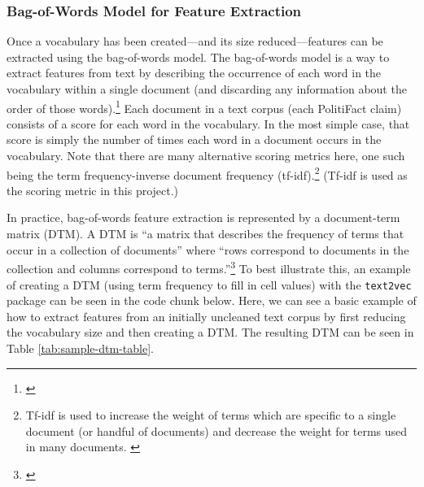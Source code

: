 \documentclass[12pt]{article}
\begin{document}
\hypertarget{bag-of-words-model-for-feature-extraction}{%
\subsubsection{Bag-of-Words Model for Feature
Extraction}\label{bag-of-words-model-for-feature-extraction}}

\label{sec:bag-of-words}

Once a vocabulary has been created---and its size reduced---features can
be extracted using the bag-of-words model. The bag-of-words model is a
way to extract features from text by describing the occurrence of each
word in the vocabulary within a single document (and discarding any
information about the order of those words).\footnote{\citet{brownleeGentleIntroductionBagofWords2017}}
Each document in a text corpus (each PolitiFact claim) consists of a
score for each word in the vocabulary. In the most simple case, that
score is simply the number of times each word in a document occurs in
the vocabulary. Note that there are many alternative scoring metrics
here, one such being the term frequency-inverse document frequency
(tf-idf).\footnote{Tf-idf is used to increase the weight of terms which
  are specific to a single document (or handful of documents) and
  decrease the weight for terms used in many documents.
  \citet{AnalyzingTextsText2vec}} (Tf-idf is used as the scoring metric
in this project.)

In practice, bag-of-words feature extraction is represented by a
document-term matrix (DTM). A DTM is ``a matrix that describes the
frequency of terms that occur in a collection of documents'' where
``rows correspond to documents in the collection and columns correspond
to terms.''\footnote{\citet{DocumenttermMatrix2020}} To best illustrate
this, an example of creating a DTM (using term frequency to fill in cell
values) with the \texttt{text2vec} package can be seen in the code chunk
below. Here, we can see a basic example of how to extract features from
an initially uncleaned text corpus by first reducing the vocabulary size
and then creating a DTM. The resulting DTM can be seen in Table
\ref{tab:sample-dtm-table}.
\end{document}
